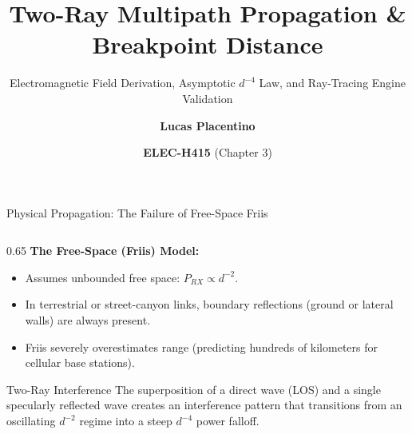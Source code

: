 \documentclass[aspectratio=169, 10pt]{beamer}
\title[\textbf{Two-Ray Ground Reflection \& Breakpoint Dynamics}]{\textbf{Two-Ray Multipath Propagation \& Breakpoint Distance}}
\subtitle{Electromagnetic Field Derivation, Asymptotic $d^{-4}$ Law, and Ray-Tracing Engine Validation}
\author[Lucas Placentino]{\textbf{Lucas Placentino}}
\institute[EPB-ULB]{École Polytechnique de Bruxelles - Université libre de Bruxelles}
\date{\textbf{ELEC-H415} (Chapter 3)}
\begin{document}
\begin{frame}[plain]
    \titlepage
\end{frame}

\begin{frame}{Physical Propagation: The Failure of Free-Space Friis}
    \begin{columns}[T]
        \begin{column}{0.65\textwidth}
            \textbf{The Free-Space (Friis) Model:}
            \begin{itemize}
                \item Assumes unbounded free space: $P_{RX} \propto d^{-2}$.
                \item In terrestrial or street-canyon links, boundary reflections (ground or lateral walls) are always present.
                \item Friis severely overestimates range (predicting hundreds of kilometers for cellular base stations).
            \end{itemize}
            
            \vspace{0.1cm}
            \begin{block}{Two-Ray Interference}
                The superposition of a direct wave (LOS) and a single specularly reflected wave creates an interference pattern that transitions from an oscillating $d^{-2}$ regime into a steep $d^{-4}$ power falloff.
            \end{block}
        \end{column}
        

\end{columns}
\end{frame}
\end{document}
